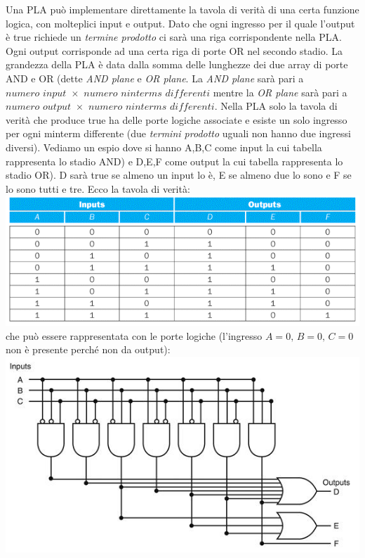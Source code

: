 \documentclass[a4paper,12pt, oneside]{book}
\begin{document}
\begin{itemize}
Una PLA può implementare direttamente la tavola di verità di una certa funzione logica, con molteplici input e output. Dato che ogni ingresso per il quale l'output è true richiede un \textit{termine prodotto} ci sarà una riga corrispondente nella PLA. Ogni output corrisponde ad una certa riga di porte OR nel secondo stadio. La grandezza della PLA è data dalla somma delle lunghezze dei due array di porte AND e OR (dette \textit{AND plane} e \textit{OR plane}. La \textit{AND plane} sarà pari a $numero\,\, input\,\, \times \,\, numero\,\, ninterms\,\, differenti$ mentre la \textit{OR plane} sarà pari a $numero\,\, output\,\, \times \,\, numero\,\, ninterms\,\, differenti$. Nella PLA solo la tavola di verità che produce true ha delle porte logiche associate e esiste un solo ingresso per ogni minterm differente (due \textit{termini prodotto} uguali non hanno due ingressi diversi).
\newpage
 Vediamo un espio dove si hanno A,B,C come input la cui tabella rappresenta lo stadio AND) e D,E,F come output la cui tabella rappresenta lo stadio OR). D sarà true se almeno un input lo è, E se almeno due lo sono e F se lo sono tutti e tre. Ecco la tavola di verità:\\
\includegraphics[scale=0.58]{img/pla1.png}\\
che può essere rappresentata con le porte logiche (l'ingresso $A=0,\,B=0,\,C=0$ non è presente perché non da output):\\
\includegraphics[scale=0.58]{img/pla2.png}\\

\end{itemize}
\end{document}
